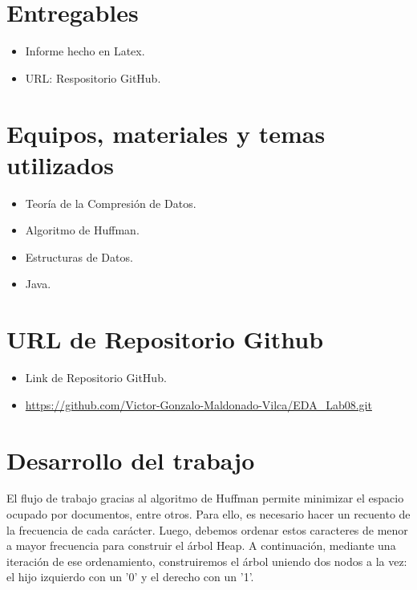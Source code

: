 \documentclass{article}
\begin{document}
 
  \section{Entregables}
  \begin{itemize}
    \item Informe hecho en Latex.
    \item URL: Respositorio GitHub.
  \end{itemize}
  
		
	\section{Equipos, materiales y temas utilizados}
  \begin{itemize}
    \item Teoría de la Compresión de Datos.
    \item Algoritmo de Huffman.
    \item Estructuras de Datos.
    \item Java.
  \end{itemize}
 

  \section{URL de Repositorio Github}
  \begin{itemize}
    \item Link de Repositorio GitHub.
    \item \url{https://github.com/Victor-Gonzalo-Maldonado-Vilca/EDA_Lab08.git}
  \end{itemize}


  \section{Desarrollo del trabajo}
  El flujo de trabajo gracias al algoritmo de Huffman permite minimizar el espacio ocupado por documentos, 
  entre otros. Para ello, es necesario hacer un recuento de la frecuencia de cada carácter. Luego, debemos 
  ordenar estos caracteres de menor a mayor frecuencia para construir el árbol Heap. A continuación, mediante 
  una iteración de ese ordenamiento, construiremos el árbol uniendo dos nodos a la vez: el hijo izquierdo con un '0' 
  y el derecho con un '1'.
  
\end{document}
